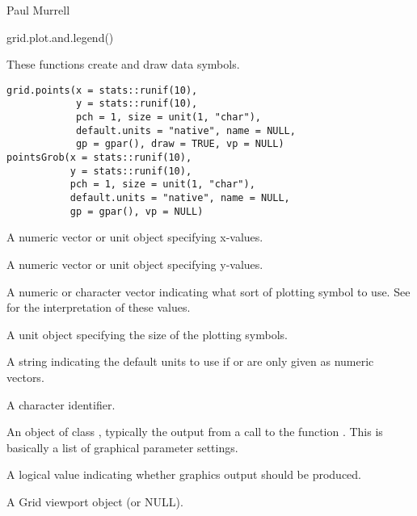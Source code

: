 %
\begin{Author}\relax
 Paul Murrell 
\end{Author}
%
\begin{Examples}
\begin{ExampleCode}
grid.plot.and.legend()
\end{ExampleCode}
\end{Examples}
%
\begin{Description}\relax
These functions create and draw data symbols.
\end{Description}
%
\begin{Usage}
\begin{verbatim}
grid.points(x = stats::runif(10),
            y = stats::runif(10),
            pch = 1, size = unit(1, "char"),
            default.units = "native", name = NULL,
            gp = gpar(), draw = TRUE, vp = NULL)
pointsGrob(x = stats::runif(10),
           y = stats::runif(10),
           pch = 1, size = unit(1, "char"),
           default.units = "native", name = NULL,
           gp = gpar(), vp = NULL)
\end{verbatim}
\end{Usage}
%
\begin{Arguments}
\begin{ldescription}
\item[\code{x}] A numeric vector or unit object specifying x-values.
\item[\code{y}] A numeric vector or unit object specifying y-values.
\item[\code{pch}] A numeric or character vector indicating what sort of
plotting symbol to use.  See  for the
interpretation of these values.
\item[\code{size}] A unit object specifying the size of the plotting symbols.
\item[\code{default.units}] A string indicating the default units to use
if  or  are only given as numeric vectors. 
\item[\code{name}]  A character identifier. 
\item[\code{gp}] An object of class , typically the output
from a call to the function .  This is basically
a list of graphical parameter settings.
\item[\code{draw}] A logical value indicating whether graphics output
should be produced.
\item[\code{vp}] A Grid viewport object (or NULL).
\end{ldescription}
\end{Arguments}
